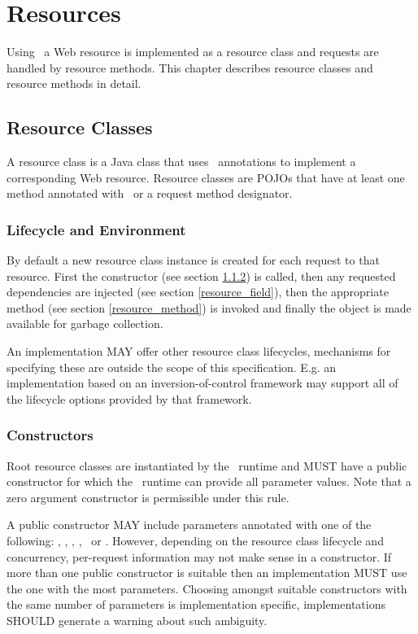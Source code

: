 \chapter{Resources}
\label{resources}

Using \jaxrs\, a Web resource is implemented as a resource class and requests are handled by resource methods. This chapter describes resource classes and resource methods in detail.

\section{Resource Classes}

A resource class is a Java class that uses \jaxrs\ annotations to implement a corresponding Web resource. Resource classes are POJOs that have at least one method annotated with \Path\ or a request method designator.

\subsection{Lifecycle and Environment}

By default a new resource class instance is created for each request to that resource. First the constructor (see section \ref{resource_class_constructor}) is called, then any requested dependencies are injected (see section \ref{resource_field}), then the appropriate method (see section \ref{resource_method}) is invoked and finally the object is made available for garbage collection.

An implementation MAY offer other resource class lifecycles, mechanisms for specifying these are outside the scope of this specification. E.g. an implementation based on an inversion-of-control framework may support all of the lifecycle options provided by that framework.

\subsection{Constructors}
\label{resource_class_constructor}

Root resource classes are instantiated by the \jaxrs\ runtime and MUST have a public constructor for which the \jaxrs\ runtime can provide all parameter values. Note that a zero argument constructor is permissible under this rule.

A public constructor MAY include parameters annotated with one of the following: \Context, \HeaderParam, \CookieParam, \MatrixParam, \QueryParam\ or \PathParam. However, depending on the resource class lifecycle and concurrency, per-request information may not make sense in a constructor. If more than one public constructor is suitable then an implementation MUST use the one with the most parameters. Choosing amongst suitable constructors with the same number of parameters is implementation specific, implementations SHOULD generate a warning about such ambiguity.

